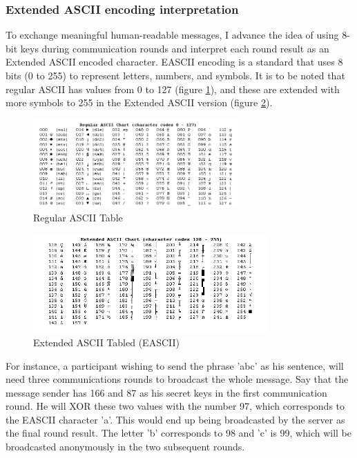 \subsubsection{Extended ASCII encoding interpretation} \label{sec:eascii1}
To exchange meaningful human-readable messages, I advance the idea of using 8-bit keys during communication rounds and interpret each round result as an Extended ASCII encoded character. 
EASCII encoding is a standard that uses 8 bits (0 to 255) to represent letters, numbers, and symbols.  It is to be noted that regular ASCII has values from 0 to 127 (figure \ref{fig:ascii}), and these are extended with more symbols to 255 in the Extended ASCII version (figure \ref{fig:eascii}). 

\begin{figure}[H]
    \centering
    \includegraphics[width=0.7\textwidth]{Images/Design/ascii.png}
    \caption{Regular ASCII Table \cite{Ascii}}
    \label{fig:ascii}
\end{figure}

\begin{figure}[H]
    \centering
    \includegraphics[width=0.8\textwidth]{Images/Design/eascii.png}
    \caption{Extended ASCII Tabled (EASCII) \cite{Ascii}}
    \label{fig:eascii}
\end{figure}


For instance, a participant wishing to send the phrase 'abc' as his sentence, will need three communications rounds to broadcast the whole message. Say that the message sender has 166 and 87 as his secret keys in the first communication round. He will XOR these two values with the number 97, which corresponds to the EASCII character 'a'. This would end up being broadcasted by the server as the final round result. The letter 'b' corresponds to 98 and 'c' is 99, which will be broadcasted anonymously in the two subsequent rounds.


